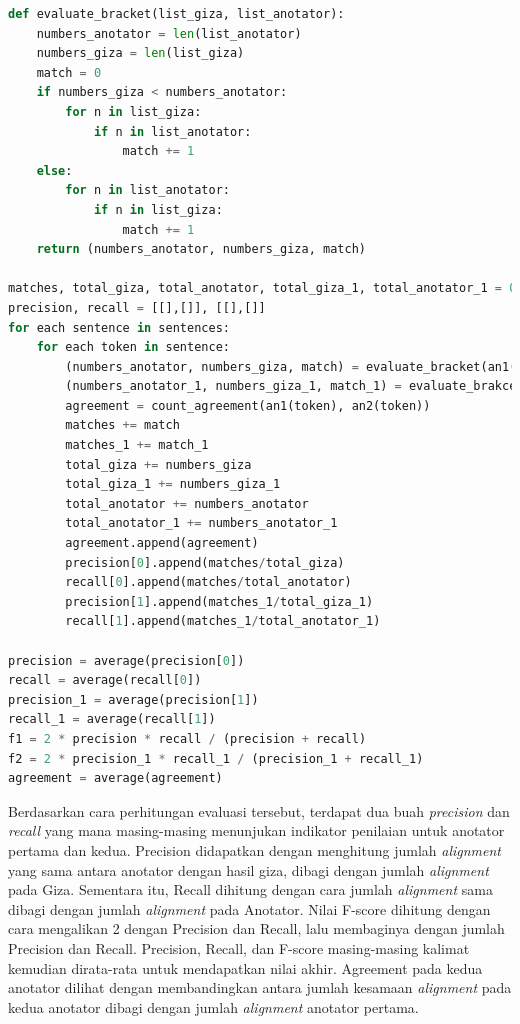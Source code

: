 \clearpage

\begin{lstlisting}[language=Python, caption={Word Alignment Evaluation}, label={word-alignment-evaluation}]
def evaluate_bracket(list_giza, list_anotator):
	numbers_anotator = len(list_anotator)
	numbers_giza = len(list_giza)
	match = 0
	if numbers_giza < numbers_anotator:
		for n in list_giza:
			if n in list_anotator:
				match += 1
	else:
		for n in list_anotator:
			if n in list_giza:
				match += 1
	return (numbers_anotator, numbers_giza, match)

matches, total_giza, total_anotator, total_giza_1, total_anotator_1 = 0, 0, 0, 0, 0
precision, recall = [[],[]], [[],[]]
for each sentence in sentences:
	for each token in sentence:
		(numbers_anotator, numbers_giza, match) = evaluate_bracket(an1(token), giza(token))
		(numbers_anotator_1, numbers_giza_1, match_1) = evaluate_brakcet(an2(token), giza(token))
		agreement = count_agreement(an1(token), an2(token))
		matches += match
		matches_1 += match_1
		total_giza += numbers_giza
		total_giza_1 += numbers_giza_1
		total_anotator += numbers_anotator
		total_anotator_1 += numbers_anotator_1
		agreement.append(agreement)
		precision[0].append(matches/total_giza)
		recall[0].append(matches/total_anotator)
		precision[1].append(matches_1/total_giza_1)
		recall[1].append(matches_1/total_anotator_1)
	
precision = average(precision[0])
recall = average(recall[0])
precision_1 = average(precision[1])
recall_1 = average(recall[1])
f1 = 2 * precision * recall / (precision + recall)
f2 = 2 * precision_1 * recall_1 / (precision_1 + recall_1)
agreement = average(agreement)	

\end{lstlisting}

Berdasarkan cara perhitungan evaluasi tersebut, terdapat dua buah \textit{precision} dan \textit{recall} yang mana masing-masing menunjukan indikator penilaian untuk anotator pertama dan kedua. Precision didapatkan dengan menghitung jumlah \textit{alignment} yang sama antara anotator dengan hasil giza, dibagi dengan jumlah \textit{alignment} pada Giza. Sementara itu, Recall dihitung dengan cara jumlah \textit{alignment} sama dibagi dengan jumlah \textit{alignment} pada Anotator. Nilai F-score dihitung dengan cara mengalikan 2 dengan Precision dan Recall, lalu membaginya dengan jumlah Precision dan Recall. Precision, Recall, dan F-score masing-masing kalimat kemudian dirata-rata untuk mendapatkan nilai akhir. Agreement pada kedua anotator dilihat dengan membandingkan antara jumlah kesamaan \textit{alignment} pada kedua anotator dibagi dengan jumlah \textit{alignment} anotator pertama.

